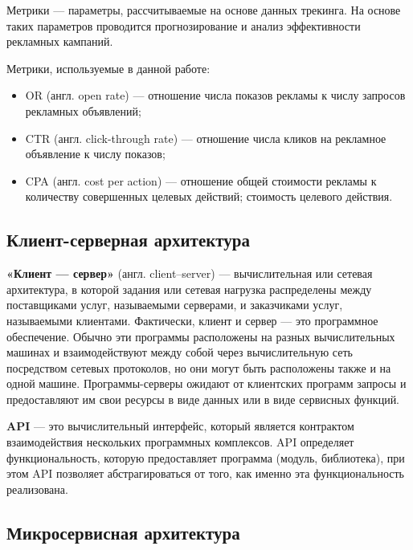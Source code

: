 \documentclass[specification,annotation,times]{itmo-student-thesis}
\begin{document}
Метрики — параметры, рассчитываемые на основе данных трекинга. На основе таких параметров проводится прогнозирование и анализ эффективности рекламных кампаний. 

Метрики, используемые в данной работе:
\begin{itemize}
\item OR (англ. open rate) — отношение числа показов рекламы к числу запросов рекламных объявлений;
\item CTR (англ. click-through rate) — отношение числа кликов на рекламное объявление к числу показов;
\item CPA (англ. cost per action) — отношение общей стоимости рекламы к количеству совершенных целевых действий; стоимость целевого действия.
\end{itemize}

\subsection{Клиент-серверная архитектура}

\textbf{«Клиент — сервер»} (англ. client–server) \label{client-server-model} — вычислительная или сетевая архитектура, в которой задания или сетевая нагрузка распределены между поставщиками услуг, называемыми серверами, и заказчиками услуг, называемыми клиентами. Фактически, клиент и сервер — это программное обеспечение. Обычно эти программы расположены на разных вычислительных машинах и взаимодействуют между собой через вычислительную сеть посредством сетевых протоколов, но они могут быть расположены также и на одной машине. Программы-серверы ожидают от клиентских программ запросы и предоставляют им свои ресурсы в виде данных или в виде сервисных функций.



\textbf{API} \label{API} — это вычислительный интерфейс, который является контрактом взаимодействия нескольких программных комплексов. API определяет функциональность, которую предоставляет программа (модуль, библиотека), при этом API позволяет абстрагироваться от того, как именно эта функциональность реализована.

\subsection{Микросервисная архитектура}
\end{document}
